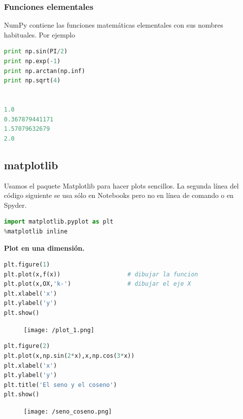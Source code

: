 \documentclass[a4paper, openright, 12pt]{article}
\begin{document}
\subsubsection{Funciones elementales}

NumPy contiene las funciones matemáticas elementales con sus nombres habituales. Por ejemplo

\begin{lstlisting}[language=Python]
print np.sin(PI/2)
print np.exp(-1)
print np.arctan(np.inf)
print np.sqrt(4)


1.0
0.367879441171
1.57079632679
2.0
\end{lstlisting}




    \newpage{}
    \subsection{matplotlib}

Usamos el paquete Matplotlib para hacer plots sencillos. La segunda línea del código siguiente se usa sólo en Notebooks pero no en línea de comando o en Spyder.

\begin{lstlisting}[language=Python]
import matplotlib.pyplot as plt
%matplotlib inline
\end{lstlisting}

\textbf{Plot en una dimensión.}\\

\begin{lstlisting}[language=Python]
plt.figure(1)
plt.plot(x,f(x))                   # dibujar la funcion
plt.plot(x,OX,'k-')                # dibujar el eje X
plt.xlabel('x')
plt.ylabel('y')
plt.show()
\end{lstlisting}

\begin{figure}[ht]
        \centering
        \texttt{[image: /plot\_1.png]}
\end{figure}


\begin{lstlisting}[language=Python]
plt.figure(2)
plt.plot(x,np.sin(2*x),x,np.cos(3*x))
plt.xlabel('x')
plt.ylabel('y')
plt.title('El seno y el coseno')
plt.show()
\end{lstlisting}

\begin{figure}[ht]
        \centering
        \texttt{[image: /seno\_coseno.png]}
\end{figure}
\end{document}
